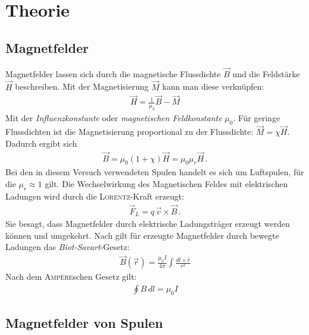 \documentclass[12pt,a4paper,titlepage,headinclude,bibtotoc]{scrartcl}
\begin{document}
\section{Theorie}
\label{sec:theorie}
\subsection{Magnetfelder}
Magnetfelder lassen sich durch die magnetische Flussdichte $\vec B$ und die Feldstärke $\vec H$ beschreiben.
Mit der Magnetisierung $\vec M$ kann man diese verknüpfen:
\begin{align}
	\vec H=\frac 1{\mu_0}\vec B-\vec M
\end{align}
Mit der \emph{Influenzkonstante} oder \emph{magnetischen Feldkonstante} $\mu_0$.
Für geringe Flussdichten ist die Magnetisierung proportional zu der Flussdichte: $\vec M=\chi\vec H$.
Dadurch ergibt sich
\begin{align}
	\vec B=\mu_0(1+\chi )\vec H=\mu_0\mu_r\vec H\, .
\end{align}
Bei den in diesem Versuch verwendeten Spulen handelt es sich um Luftspulen, für die $\mu_r\approx 1$ gilt.
Die Wechselwirkung des Magnetischen Feldes mit elektrischen Ladungen wird durch die \textsc{Lorentz}-Kraft erzeugt:
\begin{align}
	\vec F_L=q\,\vec v\times \vec B\,.\label{eq:Lorentz}
\end{align}
Sie besagt, dass Magnetfelder durch elektrische Ladungsträger erzeugt werden können und umgekehrt.
Nach \cite[S.215]{griffith} gilt für erzeugte Magnetfelder durch bewegte Ladungen das \emph{Biot-Savart}-Gesetz:
\begin{align}
	\vec B(\vec r)=\frac{\mu_0 I}{4\pi}\int\frac{dl\times \hat r}{r^2}\label{eq:Biot}
\end{align}
Nach dem \textsc{Ampère}schen Gesetz gilt:
\begin{align}
	\oint B\, dl=\mu_0I\label{eq:mu}
\end{align}

\subsection{Magnetfelder von Spulen}
\end{document}
